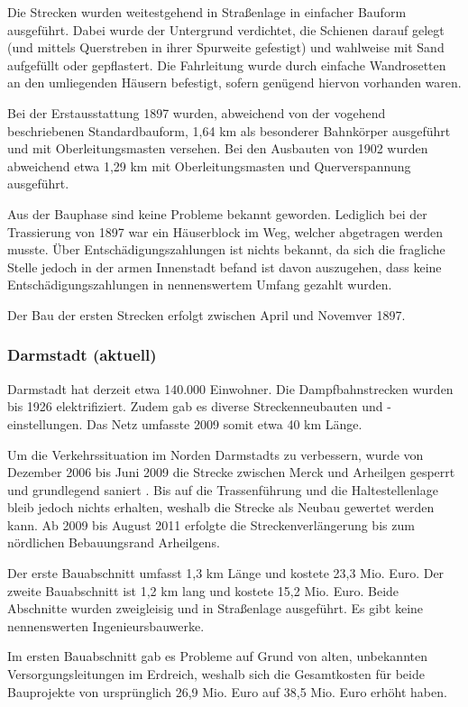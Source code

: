 Die Strecken wurden weitestgehend in Straßenlage in einfacher Bauform ausgeführt. Dabei
wurde der Untergrund verdichtet, die Schienen darauf gelegt (und mittels Querstreben in
ihrer Spurweite gefestigt) und wahlweise mit Sand aufgefüllt oder gepflastert. Die
Fahrleitung wurde durch einfache Wandrosetten an den umliegenden Häusern befestigt,
sofern genügend hiervon vorhanden waren.

Bei der Erstausstattung 1897 wurden, abweichend von der vogehend beschriebenen
Standardbauform, 1,64 km als besonderer Bahnkörper ausgeführt und mit Oberleitungsmasten
versehen.
Bei den Ausbauten von 1902 wurden abweichend etwa 1,29 km mit Oberleitungsmasten und
Querverspannung ausgeführt.

Aus der Bauphase sind keine Probleme bekannt geworden. Lediglich bei der Trassierung von
1897 war ein Häuserblock im Weg, welcher abgetragen werden musste. Über
Entschädigungszahlungen ist nichts bekannt, da sich die fragliche Stelle jedoch in der
armen Innenstadt befand ist davon auszugehen, dass keine Entschädigungszahlungen in
nennenswertem Umfang gezahlt wurden.

Der Bau der ersten Strecken erfolgt zwischen April und Novemver 1897.

\subsubsection*{Darmstadt (aktuell)}

Darmstadt hat derzeit etwa 140.000 Einwohner. Die Dampfbahnstrecken wurden bis 1926
elektrifiziert. Zudem gab es diverse Streckenneubauten und -einstellungen. Das Netz
umfasste 2009 somit etwa 40 km Länge.

Um die Verkehrssituation im Norden Darmstadts zu verbessern, wurde von Dezember 2006
bis Juni 2009 die Strecke zwischen Merck und Arheilgen gesperrt und grundlegend saniert \cite{eoDaAr1}.
Bis auf die Trassenführung und die Haltestellenlage bleib jedoch nichts erhalten, weshalb
die Strecke als Neubau gewertet werden kann. Ab 2009 bis August 2011 erfolgte die
Streckenverlängerung bis zum nördlichen Bebauungsrand Arheilgens.

Der erste Bauabschnitt umfasst 1,3 km Länge und kostete 23,3 Mio. Euro. Der zweite
Bauabschnitt ist 1,2 km lang und kostete 15,2 Mio. Euro. Beide Abschnitte wurden
zweigleisig und in Straßenlage ausgeführt. Es gibt keine nennenswerten Ingenieursbauwerke.

Im ersten Bauabschnitt gab es Probleme auf Grund von alten, unbekannten
Versorgungsleitungen im Erdreich, weshalb sich die Gesamtkosten für beide Bauprojekte von
ursprünglich 26,9 Mio. Euro auf 38,5 Mio. Euro erhöht haben.

